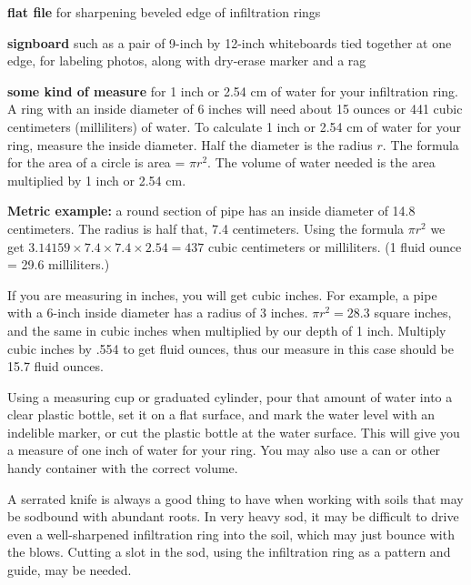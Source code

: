 \documentclass[11pt,letterpaper,twoside,onecolumn]{memoir}
\begin{document}
\begin{checkboxlist}
\item \textbf{flat file} for sharpening beveled edge of infiltration rings

\item \textbf{signboard} such as a pair of 9-inch by 12-inch whiteboards tied together at one edge, for labeling photos, along with dry-erase marker and a rag 

\item {\textbf{some kind of measure} for 1 inch or 2.54 cm of water for your infiltration ring. A ring with an inside diameter of 6 inches will need about 15 ounces or 441 cubic centimeters (milliliters) of water. To calculate 1 inch or 2.54 cm of water for your ring, measure the inside diameter. Half the diameter is the radius $r$. The formula for the area of a circle is area = $\pi r^{2}$. The volume of water needed is the area multiplied by 1 inch or 2.54 cm.

\textbf{Metric example:} a round section of pipe has an inside diameter of 14.8 centimeters. The radius is half that, 7.4 centimeters. Using the formula $\pi r^{2}$ we get $3.14159 \times 7.4 \times 7.4 \times 2.54 = 437$ cubic centimeters or milliliters. (1 fluid ounce = 29.6 milliliters.) 

If you are measuring in inches, you will get cubic inches. For example, a pipe with a 6-inch inside diameter has a radius of 3 inches.  $\pi r^{2} = 28.3$ square inches, and the same in cubic inches when multiplied by our depth of 1 inch. Multiply cubic inches by .554  to get fluid ounces, thus our measure in this case should be 15.7 fluid ounces. 

Using a measuring cup or graduated cylinder, pour that amount of water into a clear plastic bottle, set it on a flat surface, and mark the water level with an indelible marker, or cut the plastic bottle at the water surface.  This will give you a measure of one inch of water for your ring. You may also use a can or other handy container with the correct volume. 
}

\item A serrated knife is always a good thing to have when working with soils that may be sodbound with abundant roots. In very heavy sod, it may be difficult to drive even a well-sharpened infiltration ring into the soil, which may just bounce with the blows. Cutting a slot in the sod, using the infiltration ring as a pattern and guide, may be needed. 

\end{checkboxlist}
\end{document}
